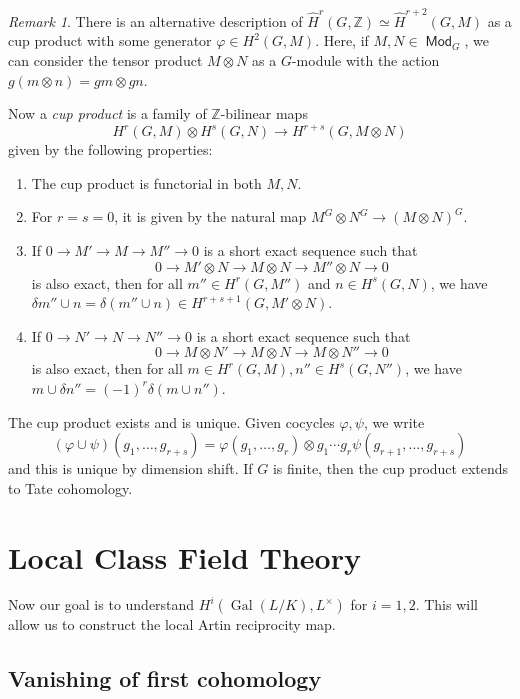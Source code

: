 \documentclass[leqno, openany]{memoir}
\theoremstyle{definition}
\theoremstyle{remark}
\newtheorem{rmk}[thm]{Remark}
\theoremstyle{plain}
\theoremstyle{definition}
\theoremstyle{remark}
\newcommand{\Z}{\mathbb{Z}}
\newcommand{\wh}[1]{\widehat{#1}}
\DeclareMathOperator{\Gal}{Gal}
\DeclareMathOperator{\Mod}{\mathsf{Mod}}
\begin{document}
\begin{rmk} There is an alternative description of $\wh{H}^r(G, \Z) \simeq
    \wh{H}^{r+2}(G, M)$ as a cup product with some generator $\varphi \in
    H^2(G, M)$. Here, if $M, N \in \Mod_G$, we can consider the tensor product
    $M \otimes N$ as a $G$-module with the action $g(m \otimes n) = gm \otimes
    gn$.

    Now a \textit{cup product} is a family of $\Z$-bilinear maps \[ H^r(G, M)
        \otimes H^s(G, N) \to H^{r+s}(G, M \otimes N) \] given by the following
        properties: \begin{enumerate} \item The cup product is functorial in
            both $M, N$.  \item For $r = s = 0$, it is given by the natural map
            $M^G \otimes N^G \to {(M \otimes N)}^G$.  \item If $0 \to M' \to M
            \to M'' \to 0$ is a short exact sequence such that \[ 0 \to M'
            \otimes N \to M \otimes N \to M'' \otimes N \to 0 \] is also exact,
            then for all $m'' \in H^r(G, M'')$ and $n \in H^s(G, N)$, we have
            $\delta m'' \cup n = \delta (m'' \cup n) \in H^{r+s+1}(G, M'
            \otimes N)$.  \item If $0 \to N' \to N \to N'' \to 0$ is a short
            exact sequence such that \[ 0 \to M \otimes N' \to M \otimes N \to
            M \otimes N'' \to 0 \] is also exact, then for all $m \in H^r(G,
            M), n'' \in H^s(G, N'')$, we have $m \cup \delta n'' = {(-1)}^r
            \delta(m \cup n'')$.  \end{enumerate} The cup product exists and is
            unique. Given cocycles $\varphi, \psi$, we write \[ (\varphi \cup
            \psi) (g_1, \ldots, g_{r+s}) = \varphi(g_1, \ldots, g_r) \otimes
        g_1 \cdots g_r \psi(g_{r+1}, \ldots, g_{r+s}) \] and this is unique by
    dimension shift. If $G$ is finite, then the cup product extends to Tate
cohomology.  \end{rmk}

\chapter{Local Class Field Theory}%

Now our goal is to understand $H^i(\Gal(L/K), L^{\times})$ for $i = 1,2$. This
will allow us to construct the local Artin reciprocity map.

\section{Vanishing of first cohomology}%
\label{sec:vanishing_of_first_cohomology}
\end{document}

